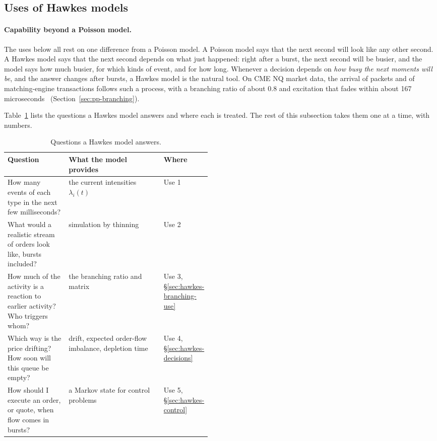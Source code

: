 \subsection{Uses of Hawkes models}
\label{sec:hawkes-uses}

\paragraph{Capability beyond a Poisson model.} The uses below all rest on one difference from a Poisson model. A Poisson model
says that the next second will look like any other second. A Hawkes model says that the next second depends on
what just happened: right after a burst, the next second will be busier, and the model says how much busier, for
which kinds of event, and for how long. Whenever a decision depends on \emph{how busy the next moments will be},
and the answer changes after bursts, a Hawkes model is the natural tool. On CME NQ market data, the arrival of packets and of matching-engine transactions follows such a
process, with a branching ratio of about 0.8 and excitation that fades within about 167
microseconds~\citep{maciejewski2026packets} (Section~\ref{sec:pp-branching}).

Table~\ref{tab:hawkes-uses} lists the questions a Hawkes model answers and where each is treated. The rest of this
subsection takes them one at a time, with numbers.

\begin{table}[!htbp]
\centering\footnotesize
\caption{Questions a Hawkes model answers.}
\label{tab:hawkes-uses}
\begin{tabularx}{\linewidth}{>{\raggedright\arraybackslash}p{0.3\linewidth}>{\raggedright\arraybackslash}X>{\raggedright\arraybackslash}p{0.17\linewidth}}
\toprule
Question & What the model provides & Where \\
\midrule
How many events of each type in the next few milliseconds? & the current intensities $\lambda_i(t)$ & Use 1 \\
What would a realistic stream of orders look like, bursts included? & simulation by thinning & Use 2 \\
How much of the activity is a reaction to earlier activity? Who triggers whom? & the branching ratio and matrix & Use 3, \S\ref{sec:hawkes-branching-use} \\
Which way is the price drifting? How soon will this queue be empty? & drift, expected order-flow imbalance, depletion time & Use 4, \S\ref{sec:hawkes-decisions} \\
How should I execute an order, or quote, when flow comes in bursts? & a Markov state for control problems & Use 5, \S\ref{sec:hawkes-control} \\
\bottomrule
\end{tabularx}
\end{table}

